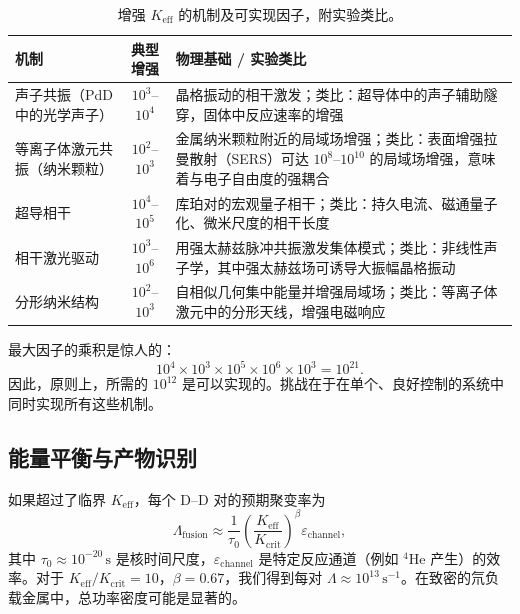 \documentclass[12pt]{article}
\theoremstyle{remark}
\newcommand{\Keff}{K_{\mathrm{eff}}}
\newcommand{\Kcrit}{K_{\mathrm{crit}}}
\begin{document}
	\begin{table}[htbp]
		\centering
		\caption{增强 \(\Keff\) 的机制及可实现因子，附实验类比。}
		\label{tab:enhancement}
		\small
		\begin{tabularx}{\textwidth}{>{\raggedright\arraybackslash}p{3.2cm} c X}
			\toprule
			\textbf{机制} & \textbf{典型增强} & \textbf{物理基础 / 实验类比} \\
			\midrule
			声子共振（PdD 中的光学声子） & \(10^3\)–\(10^4\) & 晶格振动的相干激发；类比：超导体中的声子辅助隧穿，固体中反应速率的增强 \cite{Storms2014, Tinkham2004} \\
			等离子体激元共振（纳米颗粒） & \(10^2\)–\(10^3\) & 金属纳米颗粒附近的局域场增强；类比：表面增强拉曼散射（SERS）可达 \(10^8\)–\(10^{10}\) 的局域场增强，意味着与电子自由度的强耦合 \cite{Maier2007, SERS} \\
			超导相干 & \(10^4\)–\(10^5\) & 库珀对的宏观量子相干；类比：持久电流、磁通量子化、微米尺度的相干长度 \cite{Tinkham2004} \\
			相干激光驱动 & \(10^3\)–\(10^6\) & 用强太赫兹脉冲共振激发集体模式；类比：非线性声子学，其中强太赫兹场可诱导大振幅晶格振动 \cite{Kampfrath2011} \\
			分形纳米结构 & \(10^2\)–\(10^3\) & 自相似几何集中能量并增强局域场；类比：等离子体激元中的分形天线，增强电磁响应 \cite{Mandelbrot1982, fractal-antenna} \\
			\bottomrule
		\end{tabularx}
	\end{table}
	
	最大因子的乘积是惊人的：
	\[
	10^4 \times 10^3 \times 10^5 \times 10^6 \times 10^3 = 10^{21}.
	\]
	因此，原则上，所需的 \(10^{12}\) 是可以实现的。挑战在于在单个、良好控制的系统中同时实现所有这些机制。
	
	\subsection{能量平衡与产物识别}
	
	如果超过了临界 \(\Keff\)，每个 D–D 对的预期聚变率为
	\begin{equation}
		\Lambda_{\text{fusion}} \approx \frac{1}{\tau_0} \left( \frac{\Keff}{\Kcrit} \right)^{\beta} \varepsilon_{\text{channel}},
		\label{eq:fusion-rate}
	\end{equation}
	其中 \(\tau_0 \approx 10^{-20}\,\text{s}\) 是核时间尺度，\(\varepsilon_{\text{channel}}\) 是特定反应通道（例如 \(^4\)He 产生）的效率。对于 \(\Keff/\Kcrit = 10\)，\(\beta = 0.67\)，我们得到每对 \(\Lambda \approx 10^{13}\,\text{s}^{-1}\)。在致密的氘负载金属中，总功率密度可能是显著的。
	
\end{document}

